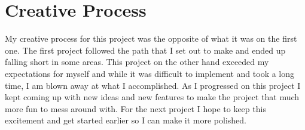\documentclass[12 pt]{report}
\begin{document}
\section{Creative Process}
\hspace{\parindent} My creative process for this project was the opposite of what it was on the first one. The first project followed the path that I set out to make and ended up falling short in some areas. This project on the other hand exceeded my expectations for myself and while it was difficult to implement and took a long time, I am blown away at what I accomplished. As I progressed on this project I kept coming up with new ideas and new features to make the project that much more fun to mess around with. For the next project I hope to keep this excitement and get started earlier so I can make it more polished.
\end{document}
